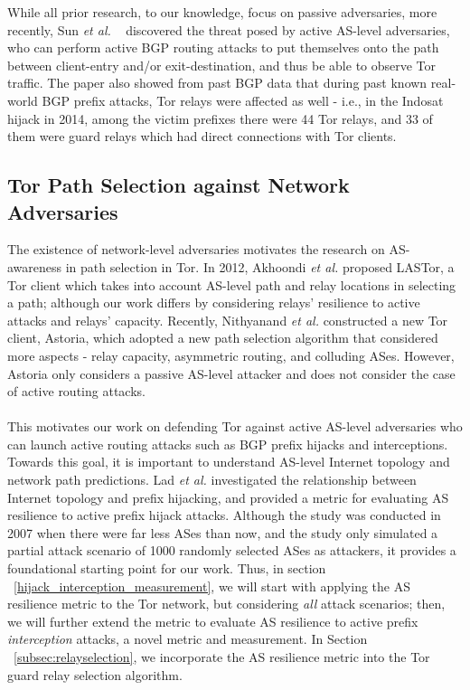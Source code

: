 While all prior research, to our knowledge, focus on passive adversaries, more recently, Sun \emph{et al.} ~\cite{sun2015raptor} discovered the threat posed by active AS-level adversaries, who can perform active BGP routing attacks to put themselves onto the path between client-entry and/or exit-destination, and thus be able to observe Tor traffic. The paper also showed from past BGP data that during past known real-world BGP prefix attacks, Tor relays were affected as well - i.e., in the Indosat hijack in 2014, among the victim prefixes there were 44 Tor relays, and 33 of them were guard relays which had direct connections with Tor clients. 

\subsection{Tor Path Selection against Network Adversaries}
The existence of network-level adversaries motivates the research on AS-awareness in path selection in Tor. In 2012, Akhoondi \emph{et al.} \cite{akhoondi2012lastor} proposed LASTor, a Tor client which takes into account AS-level path and relay locations in selecting a path; although our work differs by considering relays' resilience to active attacks and relays' capacity. Recently, Nithyanand \emph{et al.} \cite{starov2015measuring} constructed a new Tor client, Astoria, which adopted a new path selection algorithm that considered more aspects - relay capacity, asymmetric routing, and colluding ASes. However, Astoria only considers a passive AS-level attacker and does not consider the case of active routing attacks.\\
\\
This motivates our work on defending Tor against active AS-level adversaries who can launch active routing attacks such as BGP prefix hijacks and interceptions. Towards this goal, it is important to understand AS-level Internet topology and network path predictions. Lad \emph{et al.} \cite{lad2007understanding} investigated the relationship between Internet topology and prefix hijacking, and provided a metric for evaluating AS resilience to active prefix hijack attacks. Although the study was conducted in 2007 when there were far less ASes than now, and the study only simulated a partial attack scenario of 1000 randomly selected ASes as attackers, it provides a foundational starting point for our work. Thus, in section ~\ref{hijack_interception_measurement}, we will start with applying the AS resilience metric to the Tor network, but considering \emph{all} attack scenarios; then, we will further extend the metric to evaluate AS resilience to active prefix \emph{interception} attacks, a novel metric and measurement. In Section ~\ref{subsec:relayselection}, we incorporate the AS resilience metric into the Tor guard relay selection algorithm. 


